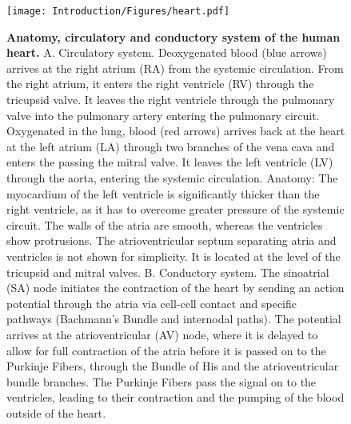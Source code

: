\begin{figure}[htbp]
	\centering
	\texttt{[image: Introduction/Figures/heart.pdf]}
	\caption[\textbf{Anatomy, circulatory and conductory system of the human heart. }]{\textbf{Anatomy, circulatory and conductory system of the human heart. }A. Circulatory system. Deoxygenated blood (blue arrows) arrives at the right atrium (RA) from the systemic circulation. From the right atrium, it enters the right ventricle (RV) through the tricupsid valve. It leaves the right ventricle through the pulmonary valve into the pulmonary artery entering the pulmonary circuit. Oxygenated in the lung, blood (red arrows) arrives back at the heart at the left atrium (LA) through two branches of the vena cava and enters the  passing the mitral valve. It leaves the left ventricle (LV) through the aorta, entering the systemic circulation. Anatomy: The myocardium of the left ventricle is significantly thicker than the right ventricle, as it has to overcome greater pressure of the systemic circuit. The walls of the atria are smooth, whereas the ventricles show protrusions. The atrioventricular septum separating atria and ventricles is not shown for simplicity. It is located at the level of the tricupsid and mitral valves. B. Conductory system. The sinoatrial (SA) node initiates the contraction of the heart by sending an action potential through the atria via cell-cell contact and specific pathways (Bachmann's Bundle and internodal paths). The potential arrives at the atrioventricular (AV) node, where it is delayed to allow for full contraction of the atria before it is passed on to the Purkinje Fibers, through the Bundle of His and the atrioventricular bundle branches. The Purkinje Fibers pass the signal on to the ventricles, leading to their contraction and the pumping of the blood outside of the heart. } 
	 	\label{fig:heart}
\end{figure}
%


